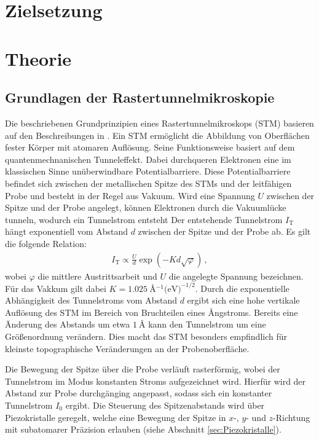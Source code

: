 \section{Zielsetzung}
\label{sec:Zielsetzung}

\section{Theorie}
\label{sec:Theorie}
\subsection{Grundlagen der Rastertunnelmikroskopie}
\label{sec:GrundlagenSTM}
Die beschriebenen Grundprinzipien eines Rastertunnelmikroskops (STM) basieren auf den Beschreibungen in \cite{Surfaces}.
Ein STM ermöglicht die Abbildung von Oberflächen fester Körper mit atomaren Auflösung. 
Seine Funktionsweise basiert auf dem quantenmechnanischen Tunneleffekt. Dabei 
durchqueren Elektronen eine im klassischen Sinne unüberwindbare Potentialbarriere. Diese Potentialbarriere befindet sich zwischen der metallischen Spitze des STMs und der leitfähigen Probe und besteht in der Regel aus Vakuum.
Wird eine Spannung $U$ zwischen der Spitze und der Probe angelegt, können Elektronen durch die Vakuumlücke tunneln, wodurch ein Tunnelstrom entsteht
Der entstehende Tunnelstrom $I_{\text{T}}$ hängt exponentiell vom Abstand $d$ zwischen der Spitze und der Probe ab. Es gilt die folgende Relation:
\begin{align}
    I_{\text{T}} \propto \frac{U}{d}\exp\left(-K d \sqrt{\varphi}\right)\,, \label{eqn:Tunnelstrom}
\end{align}
wobei $\varphi$ die mittlere Austrittsarbeit und $U$ die angelegte Spannung bezeichnen. 
Für das Vakkum gilt dabei $K = \SI{1.025}{\angstrom^{-1} (\eV)^{-1/2}}$.
Durch die exponentielle Abhängigkeit des Tunnelstroms vom Abstand $d$ ergibt sich eine hohe vertikale Auflösung des STM im Bereich von Bruchteilen eines {\AA}ngstroms. 
Bereits eine Änderung des Abstands um etwa $\SI{1}{\angstrom}$ kann den Tunnelstrom um eine Größenordnung verändern. Dies macht das STM besonders empfindlich für kleinste topographische Veränderungen an der Probenoberfläche.

Die Bewegung der Spitze über die Probe verläuft rasterförmig, wobei der Tunnelstrom im Modus konstanten Stroms aufgezeichnet wird. Hierfür wird der Abstand zur Probe durchgänging angepasst, sodass sich ein konstanter Tunnelstrom $I_0$ ergibt. Die Steuerung des Spitzenabstands wird über Piezokristalle geregelt, welche eine Bewegung der Spitze in $x$-, $y$- und $z$-Richtung mit subatomarer Präzision erlauben (siehe Abschnitt \ref{sec:Piezokristalle}). 

